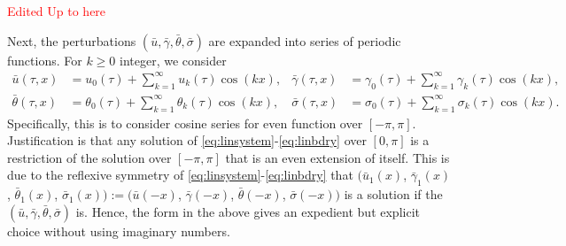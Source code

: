 \documentclass[a4paper,11pt]{article}
\def\bg{{\bar{\gamma}}}
\def\bth{{\bar{\theta}}}
\def\bs{{\bar{\sigma}}}
\def\bu{{\bar{u}}}
\newcommand{\tcr}{\textcolor{red}}
\theoremstyle{remark}
\begin{document}
\tcr{Edited Up to here}

Next, the perturbations $(\bu, \bg, \bth, \bs)$ are expanded into series of periodic functions. For $k\ge0$ integer, we consider
\begin{align*}
 \bar u(\tau,x) &= u_0(\tau) + \sum_{k=1}^\infty  u_k(\tau)\cos(k x), &
\bar \gamma(\tau,x) &= \gamma_0(\tau) + \sum_{k=1}^\infty \gamma_k(\tau)\cos(k x),\\
\bar \theta(\tau,x) &= \theta_0(\tau) + \sum_{k=1}^\infty \theta_k(\tau)\cos(k x), &
 \bar\sigma(\tau,x) &= \sigma_0(\tau) + \sum_{k=1}^\infty \sigma_k(\tau)\cos(k x).
\end{align*}
Specifically, this is to consider cosine series for even function over $[-\pi,\pi]$. Justification is that any solution of \eqref{eq:linsystem}-\eqref{eq:linbdry} over $[0,\pi]$ is a restriction of the solution over $[-\pi,\pi]$ that is an even extension of itself. This is due to the reflexive symmetry of \eqref{eq:linsystem}-\eqref{eq:linbdry} that $(\bu_1(x)$, $\bg_1(x)$, $\bth_1(x)$, $\bs_1(x)):=(\bu(-x)$, $\bg(-x)$, $\bth(-x)$, $\bs(-x))$ is a solution if the $(\bu, \bg, \bth, \bs)$ is.  Hence, the form in the above gives an expedient but explicit choice without using imaginary numbers. %
\end{document}
